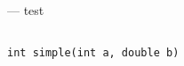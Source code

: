 \startmanpage
{}
--- test 
\startvb\begin{verbatim}

int simple(int a, double b)
\end{verbatim}
\endvb

\endmanpage
